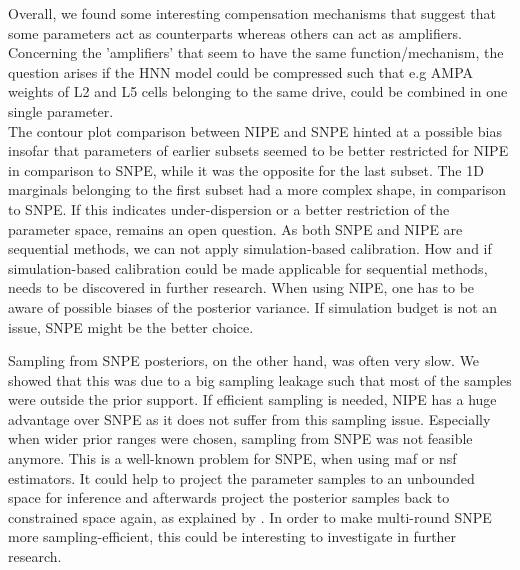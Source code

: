 \documentclass[12pt]{extreport}
\begin{document}
Overall, we found some interesting compensation mechanisms that suggest that some parameters act as counterparts whereas others can act as amplifiers. Concerning the 'amplifiers' that seem to have the same function/mechanism, the question arises if the HNN model could be compressed such that e.g AMPA weights of L2 and L5 cells belonging to the same drive, could be combined in one single parameter.\\


The contour plot comparison between NIPE and SNPE hinted at a possible bias insofar that parameters of earlier subsets seemed to be better restricted for NIPE in comparison to SNPE, while it was the
opposite for the last subset. The 1D marginals belonging to the first subset had a more complex shape, in comparison to SNPE. If this indicates under-dispersion or a better restriction of the parameter space, remains an open question. As both SNPE and NIPE are sequential methods, we can not apply simulation-based calibration. How and if simulation-based calibration could be made applicable for sequential methods, needs to be discovered in further research. When using NIPE, one has to be aware of possible biases of the posterior variance. If simulation budget is not an issue, SNPE might be the better choice.

Sampling from SNPE posteriors, on the other hand, was often very slow. We showed that this was due to a big sampling leakage such that most of the samples were outside the prior support. If efficient sampling is needed, NIPE has a huge advantage over SNPE as it does not suffer from this sampling issue. Especially when wider prior ranges were chosen, sampling from SNPE was not feasible anymore. This is a well-known problem for SNPE, when using maf or nsf estimators. It could help to project the parameter samples to an unbounded space for inference and afterwards project the posterior samples back to constrained space again, as explained by \cite{gonccalves2020training}. In order to make multi-round SNPE more sampling-efficient, this could be interesting to investigate in further research. \\
\end{document}

